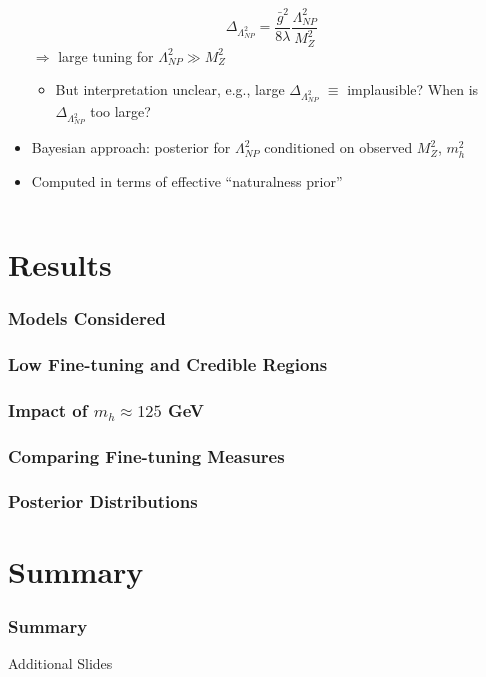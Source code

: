 \documentclass[10pt,aspectratio=169]{beamer}
\begin{document}
\begin{frame}
\begin{columns}[t]
\begin{column}{0.5\textwidth}
\begin{itemize}
\begin{equation*}
          \Delta_{\Lambda_{NP}^2} = \frac{\bar{g}^2}{8 \lambda}
          \frac{\Lambda_{NP}^2}{M_Z^2}
        \end{equation*}
        $\Rightarrow$ large tuning for $\Lambda_{NP}^2 \gg M_Z^2$
        \begin{itemize}
        \item But interpretation unclear, e.g., large $\Delta_{\Lambda_{NP}^2}$
          $\equiv$ implausible? When is $\Delta_{\Lambda_{NP}^2}$ too large?
        \end{itemize}
      \item Bayesian approach: posterior for $\Lambda_{NP}^2$ conditioned on
        observed $M_Z^2$, $m_h^2$
      \item Computed in terms of effective ``naturalness prior''
      \end{itemize}
    \end{column}
  \end{columns}
\end{frame}

\section{Results}

\begin{frame}
  \frametitle{Models Considered}
\end{frame}

\begin{frame}
  \frametitle{Low Fine-tuning and Credible Regions}
\end{frame}

\begin{frame}
  \frametitle{Impact of $m_h \approx 125$ GeV}
\end{frame}

\begin{frame}
  \frametitle{Comparing Fine-tuning Measures}
\end{frame}

\begin{frame}
  \frametitle{Posterior Distributions}
\end{frame}

\section{Summary}

\begin{frame}
  \frametitle{Summary}
\end{frame}

\appendix

\begin{frame}
  \begin{center}
    {
      \Large
      Additional Slides
    }
  \end{center}
\end{frame}
\end{document}
